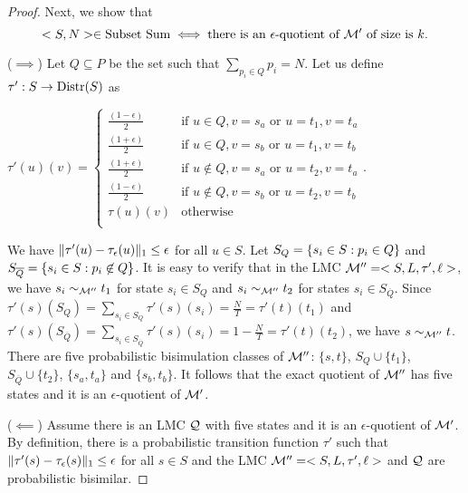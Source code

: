 \begin{proof}
	Next, we show that
	$$<S, N> \in {\mbox{Subset Sum}} \iff 
	\text{there is an } \epsilon\text{-quotient of }\mathcal{M}'\text{ of size is }k.$$
	
	($\implies$)
	Let $Q \subseteq P$ be the set such that $\sum_{p_i \in Q} p_i = N$. Let us define $\tau': S \to \mathrm{Distr}(S)$ as %
	
	$
	\tau'(u)(v) = \left \{
	\begin{array}{ll}
	\frac{(1-\epsilon)}{2} & \mbox{if $u \in Q, v = s_a$  or $u = t_1, v = t_a$}\\
	\frac{(1+\epsilon)}{2} & \mbox{if $u \in Q, v = s_b$ or $u = t_1, v = t_b$}\\
	\frac{(1+\epsilon)}{2} & \mbox{if $u \not\in Q, v = s_a$ or $u = t_2, v = t_a$}\\
	\frac{(1-\epsilon)}{2} & \mbox{if $u \not\in Q, v = s_b$ or $u = t_2, v = t_b$}\\
	\tau(u)(v) & \mbox{otherwise}\\
	\end{array}
	\right .
	$.
	
	We have $\|\tau'(u) - \tau_{\epsilon}(u)\|_1 \le \epsilon$ for all $u \in S$.	Let $S_Q = \{s_i \in S : p_i \in Q\}$ and $S_{\overline{Q}} = \{ s_i \in S : p_i \not\in Q \}$. It is easy to verify that in the LMC $\mathcal{M}'' = <S,L,\tau',\ell>$, we have $s_i \sim_{\mathcal{M}''} t_1$ for state $s_i \in S_Q$ and $s_i \sim_{\mathcal{M}''} t_2$ for states $s_i \in S_{\overline{Q}}$. Since $\tau'(s)(S_Q) = \sum_{s_i \in S_Q} \tau'(s)(s_i) = \frac{N}{T} = \tau'(t)(t_1)$ and $\tau'(s)(S_{\overline{Q}}) = \sum_{s_i \in S_{\overline{Q}}} \tau'(s)(s_i) = 1- \frac{N}{T} = \tau'(t)(t_2)$, we have $s \sim_{\mathcal{M}''} t$. There are five probabilistic bisimulation classes of $\mathcal{M}''$: $\{s, t\}$, $S_Q \cup \{t_1\}$, $S_{\overline{Q}} \cup \{t_2\}$, $\{s_a, t_a\}$ and $\{s_b, t_b\}$. It follows that the exact quotient of $\mathcal{M}''$ has five states and it is an $\epsilon$-quotient of $\mathcal{M}'$.
	
	($\impliedby$)
	Assume there is an LMC $\mathcal{Q}$ with five states and it is an $\epsilon$-quotient of $\mathcal{M}'$. By definition, 	there is a probabilistic transition function $\tau'$ such that $\|\tau'(s)-\tau_{\epsilon}(s)\|_1 \le \epsilon$ for all $s \in S$ and the LMC $\mathcal{M}'' = <S, L, \tau', \ell>$ and $\mathcal{Q}$ are probabilistic bisimilar.
	

\end{proof}
